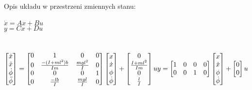 \documentclass[a4paper,12pt,twoside,openany]{report}
\begin{document}
\noindent Opis układu w przestrzeni zmiennych stanu:\\
\\
\noindent $\dot{x}=Ax+Bu$ \\
$y=Cx+Du$ \\
\\
\\$
     \begin{bmatrix}
       \dot{x} \\
       \ddot{x} \\
       \dot{\phi} \\
       \ddot{\phi}
     \end{bmatrix}
     =
     \begin{bmatrix}
       0 & 1 & 0 & 0          \\
       0 & \frac{-(I+ml^2)b}{Im} & \frac{mgl^2}{I} & 0 \\
       0 & 0 & 0 & 1 \\
       0 & \frac{-lb}{I} & \frac{mgl}{I} & 0 
     \end{bmatrix}
     \begin{bmatrix}
       x \\
       \dot{x} \\
       \phi \\
       \dot{\phi}
     \end{bmatrix}
     +
     \begin{bmatrix}
       0 \\
       \frac{I+ml^2}{Im} \\
       0 \\
       \frac{l}{I}
     \end{bmatrix}
     u\\
     y=
     \begin{bmatrix}
       1 & 0 & 0 & 0 \\
       0 & 0 & 1 & 0 
     \end{bmatrix}
     \begin{bmatrix}
       x \\
       \dot{x} \\
       \phi \\
       \dot{\phi}
     \end{bmatrix}
     +
     \begin{bmatrix}
       0 \\
       0 
     \end{bmatrix}
     u
$
\\
\\
\end{document}
